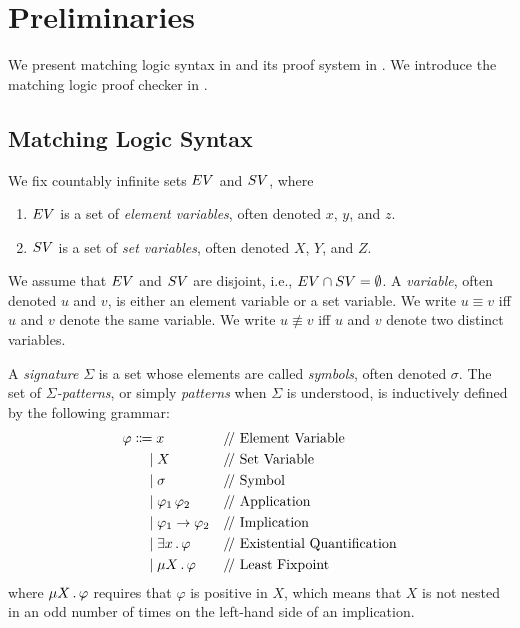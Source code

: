 \documentclass{article}
\begin{document}
\section{Preliminaries}

We present matching logic syntax in 
and its proof system in . 
We introduce the matching logic proof checker in . 

\subsection{Matching Logic Syntax}
\label{sec:ml_syntax}

We fix countably infinite sets $EV$ and $SV$, where
\begin{enumerate}
\item $EV$ is a set of \emph{element variables},
      often denoted $x$, $y$, and $z$. 
\item $SV$ is a set of \emph{set variables},
      often denoted $X$, $Y$, and $Z$.
\end{enumerate}
We assume that $EV$ and $SV$ are disjoint, i.e., $EV \cap SV = \emptyset$. 
A \emph{variable}, often denoted $u$ and $v$,
is either an element variable or a set variable.
We write $u \equiv v$ iff $u$ and $v$ denote the same variable.
We write $u \not\equiv v$ iff $u$ and $v$ denote two distinct variables. 

\begin{definition}
\label{def:ml_patterns}
A \emph{signature} $\Sigma$ is a set whose elements are called 
\emph{symbols}, often denoted $\sigma$. 
The set of \emph{$\Sigma$-patterns},
or simply \emph{patterns} when $\Sigma$ is understood,
is inductively defined by the following grammar:
\begin{align*}
\varphi 
&\Coloneqq x 
  && \text{\Slash Element Variable} 
\\&\ \ \ \mid X 
  && \text{\Slash Set Variable}
\\&\ \ \ \mid \sigma 
  && \text{\Slash Symbol}
\\&\ \ \ \mid \varphi_1 \, \varphi_2
  && \text{\Slash Application}
\\&\ \ \ \mid \varphi_1 \imp \varphi_2
  && \text{\Slash Implication}
\\&\ \ \ \mid \exists x \ld \varphi
  && \text{\Slash Existential Quantification}
\\&\ \ \ \mid \mu X \ld \varphi
  && \text{\Slash Least Fixpoint}
\end{align*}
where $\mu X \,.\, \varphi$ requires that $\varphi$ is positive in $X$,
which means that $X$ is not nested in an odd number 
of times on the left-hand side of an implication. 
\end{definition}
\end{document}

